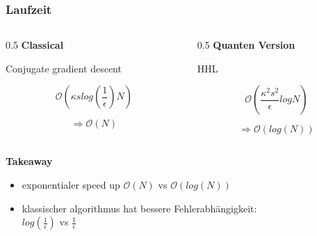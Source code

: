 \begin{frame}
    \frametitle{Laufzeit}
    \begin{columns}[c]
        \begin{column}{0.5\hsize}
            \textbf{Classical}

            \hfil

            Conjugate gradient descent 

            $$ \mathcal{O}(\kappa s log{\left(\frac 1 \epsilon\right)} N ) $$

            $$ \Rightarrow \mathcal{O} (N) $$

        \end{column}
        

        \begin{column}{0.5\hsize}
            \textbf{Quanten Version}

            \hfil

            HHL

            $$ \mathcal{O}(\frac{\kappa^2s^2}{\epsilon}logN) $$

            $$ \Rightarrow \mathcal{O} (log(N)) $$
        \end{column}

    \end{columns}
 
    \hfil

    \hfil

    \textbf{Takeaway}
    \begin{itemize}
        \item exponentialer speed up $\mathcal{O} (N)$ vs $\mathcal{O} (log(N))$
        \item klassischer algorithmus hat bessere Fehlerabhängigkeit: \\$log(\frac1{\epsilon})$ vs $\frac{1}{\epsilon}$
    \end{itemize}


\end{frame}



